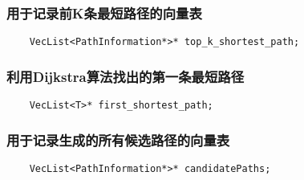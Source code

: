 \subsubsection{用于记录前K条最短路径的向量表}
    \begin{lstlisting}
    VecList<PathInformation*>* top_k_shortest_path;
    \end{lstlisting}
\subsubsection{利用Dijkstra算法找出的第一条最短路径}
    \begin{lstlisting}
    VecList<T>* first_shortest_path;
    \end{lstlisting}
\subsubsection{用于记录生成的所有候选路径的向量表}
    \begin{lstlisting}
    VecList<PathInformation*>* candidatePaths;
    \end{lstlisting}